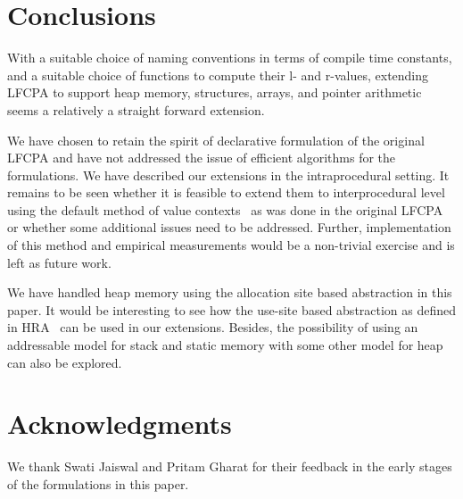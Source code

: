 \documentclass[a4paper,11pt,fleqn]{article}
\begin{document}
\section{Conclusions}
\label{sec:conclusions}

With a suitable choice of naming conventions in terms of compile time
constants, and a suitable choice of functions to compute their l- and
r-values, extending LFCPA to support heap memory, structures, arrays,
and pointer arithmetic seems a relatively a straight forward extension.

We have chosen to retain the spirit of declarative formulation of the
original LFCPA and have not addressed the issue of efficient algorithms
for the formulations. 
We have described our
extensions in the intraprocedural setting. It remains to be seen
whether it is feasible to extend them to interprocedural
level using the default method of value contexts~\cite{Khedker.UP.Karkare.B:2008:Efficiency-Precision-Simplicity,Khedker.UP.Sanyal.A.Karkare.B:2009:Data-Flow-Analysis,Padhye:2013:IDF:2487568.2487569}
as was done in the original LFCPA 
or whether some additional issues need to be addressed. Further,
implementation of this method and empirical measurements would be a
non-trivial exercise and is left as future work.

We have handled heap memory using the allocation site
based abstraction in this paper. It would be interesting
to see how the use-site based abstraction as defined in
HRA~\cite{Khedker.UP.Sanyal.A.Karkare.A:2007:Heap-reference-analysis}
can be used in our extensions. Besides, the possibility of 
using an addressable model for stack and static memory with some
other model for heap can also be explored.

\section*{Acknowledgments}

We thank Swati Jaiswal and Pritam Gharat for their feedback in the early stages of the formulations in this paper.


\end{document}
